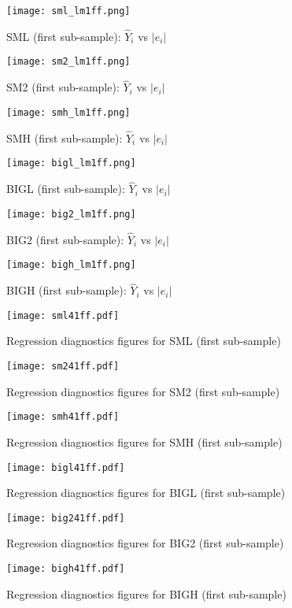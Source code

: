 \documentclass[11pt]{article}
\begin{document}
\begin{figure}
\centering
\texttt{[image: sml\_lm1ff.png]}
\caption{SML (first sub-sample): $\hat{Y}_i$ vs $|e_i|$}
\label{smllm1ff}
\texttt{[image: sm2\_lm1ff.png]}
\caption{SM2 (first sub-sample): $\hat{Y}_i$ vs $|e_i|$}
\label{sm2lm1ff}
\end{figure}
\begin{figure}
\centering
\texttt{[image: smh\_lm1ff.png]}
\caption{SMH (first sub-sample): $\hat{Y}_i$ vs $|e_i|$}
\label{smhlm1ff}
\texttt{[image: bigl\_lm1ff.png]}
\caption{BIGL (first sub-sample): $\hat{Y}_i$ vs $|e_i|$}
\label{bigllm1ff}
\end{figure}
\begin{figure}
\centering
\texttt{[image: big2\_lm1ff.png]}
\caption{BIG2 (first sub-sample): $\hat{Y}_i$ vs $|e_i|$}
\label{big2lm1ff}
\texttt{[image: bigh\_lm1ff.png]}
\caption{BIGH (first sub-sample): $\hat{Y}_i$ vs $|e_i|$}
\label{bighlm1ff}
\end{figure}

\FloatBarrier 
\begin{figure}
\texttt{[image: sml41ff.pdf]}
\caption{Regression diagnostics figures for SML (first sub-sample) }
\label{sml41ff}
\end{figure}
\begin{figure}
\texttt{[image: sm241ff.pdf]}
\caption{Regression diagnostics figures for SM2 (first sub-sample)}
\label{sm241ff}
\end{figure}
\begin{figure}
\texttt{[image: smh41ff.pdf]}
\caption{Regression diagnostics figures for SMH (first sub-sample)}
\label{smh41ff}
\end{figure}
\begin{figure}
\texttt{[image: bigl41ff.pdf]}
\caption{Regression diagnostics figures for BIGL (first sub-sample)}
\label{bigl41ff}
\end{figure}
\FloatBarrier
\begin{figure}
\texttt{[image: big241ff.pdf]}
\caption{Regression diagnostics figures for BIG2 (first sub-sample)}
\label{big241ff}
\end{figure}
\begin{figure}
\centering
\texttt{[image: bigh41ff.pdf]}
\caption{Regression diagnostics figures for BIGH (first sub-sample)}
\label{bigh41ff}
\end{figure}
\end{document}
